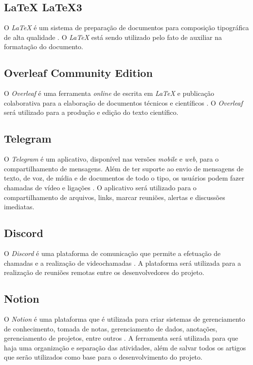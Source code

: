 \subsection{LaTeX LaTeX3}
O \textit{LaTeX} é um sistema de preparação de documentos para composição tipográfica de alta qualidade \cite{latex}. O \textit{LaTeX} está sendo utilizado pelo fato de auxiliar na formatação do documento.

\subsection{Overleaf Community Edition}
O \textit{Overleaf} é uma ferramenta \textit{online} de escrita em \textit{LaTeX} e publicação colaborativa para a elaboração de documentos técnicos e científicos \cite{overleaf}. O \textit{Overleaf} será utilizado para a produção e edição do texto científico.

\subsection{Telegram}
O \textit{Telegram} é um aplicativo, disponível nas versões \textit{mobile} e \textit{web}, para o compartilhamento de mensagens. Além de ter suporte ao envio de mensagens de texto, de voz, de mídia e de documentos de todo o tipo, os usuários podem fazer chamadas de vídeo e ligações \cite{telegram}. O aplicativo será utilizado para o compartilhamento de arquivos, links, marcar reuniões, alertas e discussões imediatas.

\subsection{Discord}
O \textit{Discord} é uma plataforma de comunicação que permite a efetuação de chamadas e a realização de videochamadas \cite{discord}. A plataforma será utilizada para a realização de reuniões remotas entre os desenvolvedores do projeto.

\subsection{Notion}
O \textit{Notion} é uma plataforma que é utilizada para criar sistemas de gerenciamento de conhecimento, tomada de notas, gerenciamento de dados, anotações, gerenciamento de projetos, entre outros \cite{notion}. A ferramenta será utilizada para que haja uma organização e separação das atividades, além de salvar todos os artigos que serão utilizados como base para o desenvolvimento do projeto.